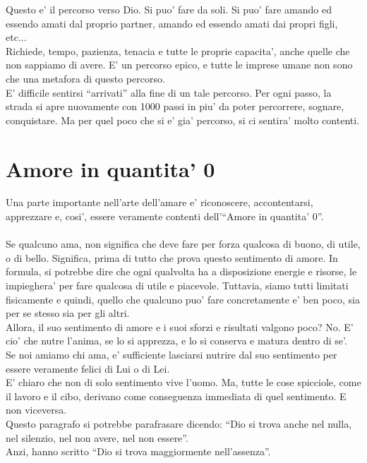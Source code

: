 Questo e' il percorso verso Dio. Si puo' fare da soli. Si puo' fare amando ed essendo amati dal proprio partner, amando ed essendo amati dai propri figli, etc...\\
Richiede, tempo, pazienza, tenacia e tutte le proprie capacita', anche quelle che non sappiamo di avere. E' un percorso epico, e tutte le imprese umane non sono che una metafora di questo percorso. \\

E' difficile sentirsi ``arrivati'' alla fine di un tale percorso. Per ogni passo, la strada si apre nuovamente con 1000 passi in piu' da poter percorrere, sognare, conquistare. Ma per quel poco che si e' gia' percorso, si ci sentira' molto contenti.

\section{Amore in quantita' 0}

Una parte importante nell'arte dell'amare e' riconoscere, accontentarsi, apprezzare e, cosi', essere veramente contenti dell'``Amore in quantita' 0''.\\
\leavevmode\\
Se qualcuno ama, non significa che deve fare per forza qualcosa di buono, di utile, o di bello. Significa, prima di tutto che prova questo sentimento di amore. In formula, si potrebbe dire che ogni qualvolta ha a disposizione energie e risorse, le impieghera' per fare qualcosa di utile e piacevole. Tuttavia, siamo tutti limitati fisicamente e quindi, quello che qualcuno puo' fare concretamente e' ben poco, sia per se stesso sia per gli altri.\\
Allora, il suo sentimento di amore e i suoi sforzi e risultati valgono poco? No. E' cio' che nutre l'anima, se lo si apprezza, e lo si conserva e matura dentro di se'.\\

Se noi amiamo chi ama, e' sufficiente lasciarsi nutrire dal suo sentimento per essere veramente felici di Lui o di Lei.\\
E' chiaro che non di solo sentimento vive l'uomo. Ma, tutte le cose spicciole, come il lavoro e il cibo, derivano come conseguenza immediata di quel sentimento. E non viceversa.\\

Questo paragrafo si potrebbe parafrasare dicendo: ``Dio si trova anche nel nulla, nel silenzio, nel non avere, nel non essere''.\\
Anzi, hanno scritto ``Dio si trova maggiormente nell'assenza''.

